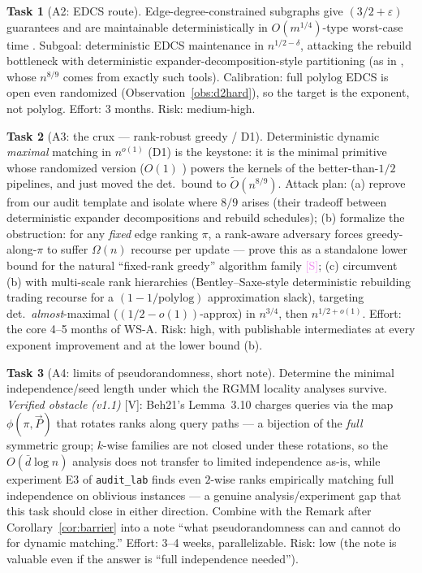 \documentclass[11pt]{article}
\theoremstyle{definition}
\newtheorem{task}{Task}
\theoremstyle{remark}
\newcommand{\statusV}{\textcolor{green!45!black}{\textsf{[V]}}}
\newcommand{\statusS}{\textcolor{violet}{\textsf{[S]}}}
\newcommand{\polylog}{\mathrm{polylog}}
\newcommand{\eps}{\varepsilon}
\newcommand{\Otil}{\widetilde{O}}
\begin{document}
\begin{task}[A2: EDCS route]\label{task:edcs}
Edge-degree-constrained subgraphs give $(3/2+\eps)$ guarantees and are
maintainable deterministically in $O(m^{1/4})$-type worst-case time
\cite{GSSU22,BS16}. Subgoal: deterministic EDCS maintenance in
$n^{1/2-\delta}$, attacking the rebuild bottleneck with deterministic
expander-decomposition-style partitioning (as in \cite{BBKS25}, whose
$n^{8/9}$ comes from exactly such tools). Calibration: full $\polylog$
EDCS is open even randomized (Observation~\ref{obs:d2hard}), so the
target is the exponent, not $\polylog$. Effort: 3 months. Risk:
medium-high.
\end{task}

\begin{task}[A3: the crux --- rank-robust greedy / D1]\label{task:rank}
Deterministic dynamic \emph{maximal} matching in $n^{o(1)}$ (D1) is the
keystone: it is the minimal primitive whose randomized version
($O(1)$ \cite{Sol16}) powers the kernels of the better-than-$1/2$
pipelines, and \cite{BBKS25} just moved the det.\ bound to
$\Otil(n^{8/9})$. Attack plan:
(a) reprove \cite{BBKS25} from our audit template and isolate where
$8/9$ arises (their tradeoff between deterministic expander
decompositions and rebuild schedules);
(b) formalize the obstruction: for any \emph{fixed} edge ranking
$\pi$, a rank-aware adversary forces greedy-along-$\pi$ to suffer
$\Omega(n)$ recourse per update --- prove this as a standalone lower
bound for the natural ``fixed-rank greedy'' algorithm family
\statusS;
(c) circumvent (b) with multi-scale rank hierarchies (Bentley--Saxe-style
deterministic rebuilding trading recourse for a $(1-1/\polylog)$
approximation slack), targeting det.\ \emph{almost}-maximal
($(1/2-o(1))$-approx) in $n^{3/4}$, then $n^{1/2+o(1)}$.
Effort: the core 4--5 months of WS-A. Risk: high, with publishable
intermediates at every exponent improvement and at the lower bound (b).
\end{task}

\begin{task}[A4: limits of pseudorandomness, short note]\label{task:prg}
Determine the minimal independence/seed length under which the RGMM
locality analyses \cite{Beh21} survive. \emph{Verified obstacle
(v1.1)} \statusV{}: Beh21's Lemma~3.10 charges queries via the map
$\phi(\pi,\vec P)$ that rotates ranks along query paths --- a
bijection of the \emph{full} symmetric group; $k$-wise families are
not closed under these rotations, so the $O(\bar d\log n)$ analysis
does not transfer to limited independence as-is, while experiment E3
of \texttt{audit\_lab} finds even $2$-wise ranks empirically
matching full independence on oblivious instances --- a genuine
analysis/experiment gap that this task should close in either
direction. Combine with the
Remark after Corollary~\ref{cor:barrier} into a note ``what
pseudorandomness can and cannot do for dynamic matching.'' Effort: 3--4
weeks, parallelizable. Risk: low (the note is valuable even if the
answer is ``full independence needed'').
\end{task}
\end{document}
